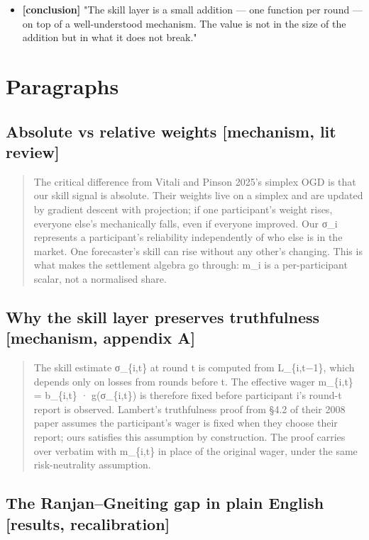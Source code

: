\documentclass[11pt,a4paper,openany]{report}
\begin{document}
\begin{itemize}
  \item \textbf{[conclusion]} "The skill layer is a small addition — one function
    per round — on top of a well-understood mechanism. The value is not
    in the size of the addition but in what it does not break."
\end{itemize}

\section{Paragraphs}

\subsection{Absolute vs relative weights [mechanism, lit review]}

\begin{quote}
The critical difference from Vitali and Pinson 2025's simplex OGD is
that our skill signal is absolute. Their weights live on a simplex
and are updated by gradient descent with projection; if one
participant's weight rises, everyone else's mechanically falls, even
if everyone improved. Our σ\_i represents a participant's reliability
independently of who else is in the market. One forecaster's skill
can rise without any other's changing. This is what makes the
settlement algebra go through: m\_i is a per-participant scalar, not a
normalised share.

\end{quote}
\subsection{Why the skill layer preserves truthfulness [mechanism, appendix A]}

\begin{quote}
The skill estimate σ\_\{i,t\} at round t is computed from
L\_\{i,t−1\}, which depends only on losses from rounds before t. The
effective wager m\_\{i,t\} = b\_\{i,t\} · g(σ\_\{i,t\}) is therefore fixed
before participant i's round-t report is observed. Lambert's
truthfulness proof from §4.2 of their 2008 paper assumes the
participant's wager is fixed when they choose their report; ours
satisfies this assumption by construction. The proof carries over
verbatim with m\_\{i,t\} in place of the original wager, under the same
risk-neutrality assumption.

\end{quote}
\subsection{The Ranjan–Gneiting gap in plain English [results, recalibration]}
\end{document}
